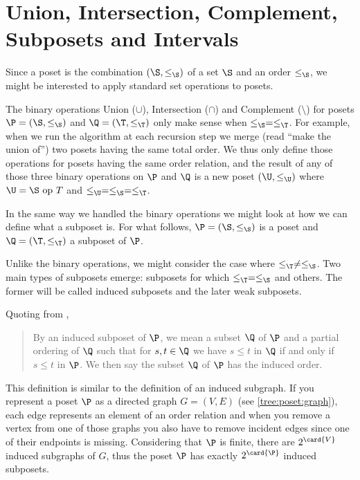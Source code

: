 \section{Union, Intersection, Complement, Subposets and Intervals}
\label{tree:poset:sub}


Since a poset is the combination $(\S, \le_{\S})$ of a set $\S$ and an order
$\le_{\S}$, we might be interested to apply standard set operations to posets.

The binary operations Union ($\cup$), Intersection ($\cap$) and Complement
($\setminus$) for posets $\P = (\S, \le_{\S})$ and $\Q = (\T, \le_{\T})$ only make sense
when $\le_{\S} = \le_{\T}$. For example, when we run the algorithm \mergesort at each
recursion step we merge (read ``make the union of'') two posets having the same
total order. We thus only define those operations for posets having the same
order relation, and the result of any of those three binary operations on $\P$
and $\Q$ is a new poset $(\U, \le_{\U})$ where $\U = \S~\text{op}~T$ and $\le_{\U} =
\le_{\S} = \le_{\T}$.


In the same way we handled the binary operations we might look at how we can
define what a subposet is. For what follows, $\P = (\S, \le_{\S})$ is a poset
and $\Q = (\T, \le_{\T})$ a subposet of $\P$.

Unlike the binary operations, we might consider the case where $\le_{\T} \neq
\le_{\S}$. Two main types of subposets emerge: subposets for which $\le_{\T} =
\le_{\S}$ and others. The former will be called induced subposets and the later
weak subposets.

Quoting from \citet*{Stanley:2011:ECV:2124415},

\begin{quotation}

By an induced subposet of $\P$, we mean a subset $\Q$ of $\P$ and a partial
ordering of $\Q$ such that for $s, t \in \Q$ we have $s \leq t$ in $\Q$ if and
only if $s \leq t$ in $\P$. We then say the subset $\Q$ of $\P$ has the induced
order.

\end{quotation}

This definition is similar to the definition of an induced subgraph. If you
represent a poset $\P$ as a directed graph $G = (V, E)$ (see
\ref{tree:poset:graph}), each edge represents an element of an order relation
and when you remove a vertex from one of those graphs you also have to remove
incident edges since one of their endpoints is missing. Considering that $\P$ is
finite, there are $2^{\card{V}}$ induced subgraphs of $G$, thus the poset $\P$ has
exactly $2^{\card{\P}}$ induced subposets.

